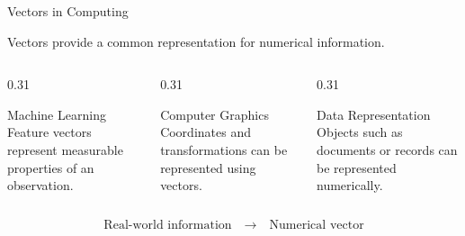 \begin{frame}{Vectors in Computing}

Vectors provide a common representation for numerical information.

\vspace{0.3cm}

\begin{columns}[T,totalwidth=\textwidth]

\begin{column}{0.31\textwidth}

\begin{block}{Machine Learning}
Feature vectors represent measurable properties of an observation.
\end{block}

\end{column}

\begin{column}{0.31\textwidth}

\begin{block}{Computer Graphics}
Coordinates and transformations can be represented using vectors.
\end{block}

\end{column}

\begin{column}{0.31\textwidth}

\begin{block}{Data Representation}
Objects such as documents or records can be represented numerically.
\end{block}

\end{column}

\end{columns}

\vspace{0.5cm}

\begin{center}
\[
\boxed{
\text{Real-world information}
\quad\longrightarrow\quad
\text{Numerical vector}
}
\]
\end{center}

\end{frame}